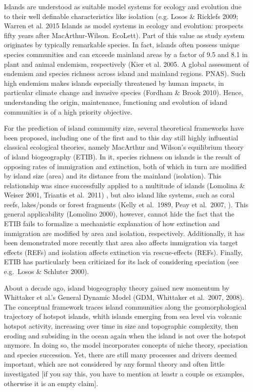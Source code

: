 \documentclass[a4paper]{scrartcl}
\begin{document}
Islands are understood as suitable model systems for ecology and evolution due to their well definable characteristics like isolation (e.g. Losos \& Ricklefs 2009; Warren et al. 2015  Islands as model systems in ecology and evolution: prospects fifty years after MacArthur‐Wilson. EcoLett). %
Part of this value as study system originates by typically remarkable species. In fact, islands often possess unique species communities and can exceede mainland areas by a factor of 9.5 and 8.1 in plant and animal  endemism, respectively (Kier et al. 2005. A global assessment of endemism and species richness across island and mainland regions. PNAS). %
Such high endemism makes islands  especially threatened by human impacts, in particular climate change and invasive species (Fordham \& Brook 2010). %
Hence, understanding the origin, maintenance, functioning and evolution of island communities is of a high priority objective.

For the prediction of island community size, several theoretical frameworks have been proposed, including one of the first and to this day still highly influential classical ecological theories, namely MacArthur and Wilson's equilibrium theory of island biogeography (ETIB). %
In it, species richness on islands is the result of opposing rates of immigration and extinction, both of which in turn are modified by island size (area) and its distance from the mainland (isolation).
This relationship was since successfully applied to a multitude of islands (Lomolina \& Weiser 2001, Triantis et al.\ 2011)%
, but also island like systems, such as coral reefs, lakes/ponds or forest fragments (Kelly et al.\ 1989, Peay et al.\ 2007, ). %
This general applicability (Lomolino 2000), however, cannot hide the fact that the ETIB fails to formalize a mechanistic explanation of how extinction and immigration are modified by area and isolation, respectively.
Additionally, it has been demonstrated more recently that area also affects immigration via target effects (REFs) and isolation affects extinction via rescue-effects (REFs). Finally, ETIB has particularly been criticized for its lack of considering speciation (see e.g.\ Losos \& Schluter 2000). %

About a decade ago, island biogeography theory gained new momentum by Whittaker et al.'s General Dynamic Model (GDM, Whittaker et al.\ 2007, 2008). %
The conceptual framework traces island communities along the geomorphological trajectory of hotspot islands,
whith islands emerging from sea level via volcanic hotspot activity, increasing over time in size and topographic complexity, then eroding and subsiding in the ocean again when the island is not over the hotspot anymore.
In doing so, the model incorporates concepts of niche theory, speciation and species succession.
Yet, there are still many processes and drivers deemed important, which are not considered by any formal theory and often little investigated [if you say this, you have to mention at leastr a couple os examples, otherwise it is an empty claim].
\end{document}
